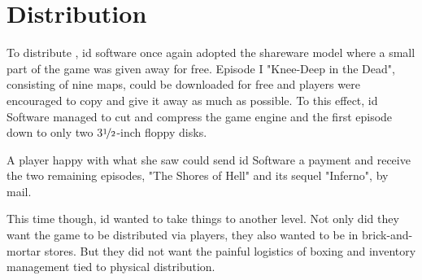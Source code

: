 \section{Distribution}
To distribute \doom, id software once again adopted the shareware model where a small part of the game was given away for free. Episode I "Knee-Deep in the Dead", consisting of nine maps, could be downloaded for free and players were encouraged to copy and give it away as much as possible. To this effect, id Software managed to cut and compress the game engine and the first episode down to only two 3$\nicefrac{1}{2}$-inch floppy disks.\\
\par 
A player happy with what she saw could send id Software a payment and receive the two remaining episodes, "The Shores of Hell" and its sequel "Inferno", by mail.\\
\par
{}
\par
This time though, id wanted to take things to another level. Not only did they want the game to be distributed via players, they also wanted to be in brick-and-mortar stores. But they did not want the painful logistics of boxing and inventory management tied to physical distribution.\newpage





